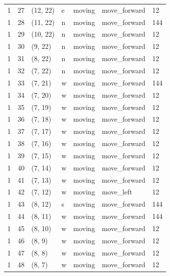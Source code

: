 \begin{table}[H]
\begin{tabular}{lllllll}
1 & 27 & (12, 22) & e & moving & move\_forward & 12 \\
1 & 28 & (11, 22) & n & moving & move\_forward & 144 \\
1 & 29 & (10, 22) & n & moving & move\_forward & 12 \\
1 & 30 & (9, 22) & n & moving & move\_forward & 12 \\
1 & 31 & (8, 22) & n & moving & move\_forward & 12 \\
1 & 32 & (7, 22) & n & moving & move\_forward & 12 \\
1 & 33 & (7, 21) & w & moving & move\_forward & 144 \\
1 & 34 & (7, 20) & w & moving & move\_forward & 12 \\
1 & 35 & (7, 19) & w & moving & move\_forward & 12 \\
1 & 36 & (7, 18) & w & moving & move\_forward & 12 \\
1 & 37 & (7, 17) & w & moving & move\_forward & 12 \\
1 & 38 & (7, 16) & w & moving & move\_forward & 12 \\
1 & 39 & (7, 15) & w & moving & move\_forward & 12 \\
1 & 40 & (7, 14) & w & moving & move\_forward & 12 \\
1 & 41 & (7, 13) & w & moving & move\_forward & 12 \\
1 & 42 & (7, 12) & w & moving & move\_left & 12 \\
1 & 43 & (8, 12) & s & moving & move\_forward & 144 \\
1 & 44 & (8, 11) & w & moving & move\_forward & 144 \\
1 & 45 & (8, 10) & w & moving & move\_forward & 12 \\
1 & 46 & (8, 9) & w & moving & move\_forward & 12 \\
1 & 47 & (8, 8) & w & moving & move\_forward & 12 \\
1 & 48 & (8, 7) & w & moving & move\_forward & 12 \\
    \bottomrule
  \end{tabular}
\end{table}

